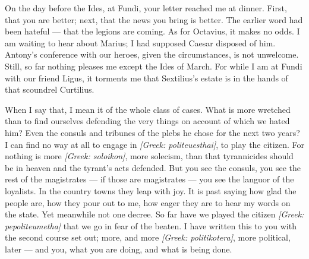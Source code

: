 

 On the day before the Ides, at Fundi, your letter reached me at dinner. First, that you are better; next, that the news you bring is better. The earlier word had been hateful --- that the legions are coming. As for Octavius, it makes no odds. I am waiting to hear about Marius; I had supposed Caesar disposed of him. Antony's conference with our heroes, given the circumstances, is not unwelcome. Still, so far nothing pleases me except the Ides of March. For while I am at Fundi with our friend Ligus, it torments me that Sextilius's estate is in the hands of that scoundrel Curtilius.

 When I say that, I mean it of the whole class of cases. What is more wretched than to find ourselves defending the very things on account of which we hated him? Even the consuls and tribunes of the plebs he chose for the next two years? I can find no way at all to engage in \textit{[Greek: politeuesthai]}, to play the citizen. For nothing is more \textit{[Greek: soloikon]}, more solecism, than that tyrannicides should be in heaven and the tyrant's acts defended. But you see the consuls, you see the rest of the magistrates --- if those are magistrates --- you see the languor of the loyalists. In the country towns they leap with joy. It is past saying how glad the people are, how they pour out to me, how eager they are to hear my words on the state. Yet meanwhile not one decree. So far have we played the citizen \textit{[Greek: pepoliteumetha]} that we go in fear of the beaten. I have written this to you with the second course set out; more, and more \textit{[Greek: politikotera]}, more political, later --- and you, what you are doing, and what is being done.
